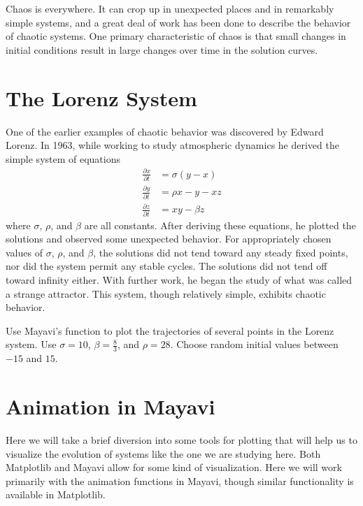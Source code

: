 \label{lab:lorenz}


Chaos is everywhere.
It can crop up in unexpected places and in remarkably simple systems, and a great deal of work has been done to describe the behavior of chaotic systems.
One primary characteristic of chaos is that small changes in initial conditions result in large changes over time in the solution curves.

\section*{The Lorenz System}
One of the earlier examples of chaotic behavior was discovered by Edward Lorenz.
In 1963, while working to study atmospheric dynamics he derived the simple system of equations
\begin{align*}
\frac{\partial x}{\partial t} &= \sigma \left(y - x\right) \\
\frac{\partial y}{\partial t} &= \rho x - y - x z \\
\frac{\partial z}{\partial t} &= x y - \beta z
\end{align*}
where $\sigma$, $\rho$, and $\beta$ are all constants.
After deriving these equations, he plotted the solutions and observed some unexpected behavior.
For appropriately chosen values of $\sigma$, $\rho$, and $\beta$, the solutions did not tend toward any steady fixed points, nor did the system permit any stable cycles.
The solutions did not tend off toward infinity either.
With further work, he began the study of what was called a strange attractor.
This system, though relatively simple, exhibits chaotic behavior.

\begin{problem}
Use Mayavi's  function to plot the trajectories of several points in the Lorenz system.
Use $\sigma = 10$, $\beta = \frac{8}{3}$, and $\rho = 28$.
Choose random initial values between $-15$ and $15$.
\end{problem}

\section*{Animation in Mayavi}
Here we will take a brief diversion into some tools for plotting that will help us to visualize the evolution of systems like the one we are studying here.
Both Matplotlib and Mayavi allow for some kind of visualization.
Here we will work primarily with the animation functions in Mayavi, though similar functionality is available in Matplotlib.

